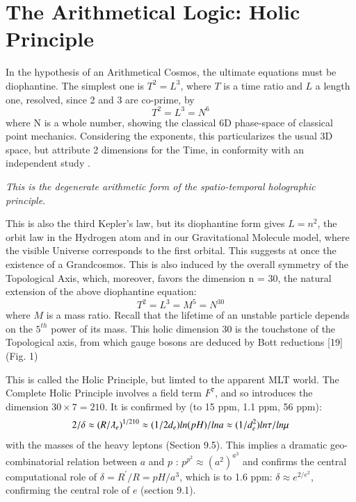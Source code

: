 \documentclass[twoside,draft]{article}
\begin{document}
\begin{sloppypar}
\section{The Arithmetical Logic: Holic Principle}

In the hypothesis of an Arithmetical Cosmos, the ultimate equations must be diophantine. The
simplest one is $T^{2} = L^{3}$, where $T$ is a time ratio and $L$ a length one, resolved, since 2 and 3 are 
co-prime, by $$T^{2} = L^{3} = N^{6}$$ where N is a whole number, showing the classical 6D phase-space of classical point mechanics. Considering the exponents, this particularizes the usual 3D space, but attribute 2 dimensions for the Time, in conformity with an independent study \cite{Bars}.

\textit{This is the degenerate arithmetic form of the spatio-temporal holographic principle}.

This is also the third Kepler's law, but its diophantine form gives $L = n^{2}$, the orbit law in the Hydrogen atom and in our
Gravitational Molecule model, where the visible Universe corresponds to the first orbital. This suggests at once the existence of a Grandcosmos. This is also induced by the overall symmetry of the Topological Axis, which, moreover, favors the
dimension n = 30, the natural extension of the above diophantine equation:
\begin{equation}
T^{2} = L^{3} = M^{5} = N^{30}
\end{equation}
where $M$ is a mass ratio. Recall that the lifetime of an unstable particle depends on the $5^{th}$ power of its mass. This holic dimension 30 is the touchstone of the Topological axis, from which gauge bosons are deduced by Bott reductions [19] (Fig. 1)

This is called the Holic Principle, but limted to the apparent MLT world. The Complete Holic
Principle \cite{Sanchez4} involves a field term $F^{7}$, and so introduces the dimension $30 \times 7 = 210$. It is confirmed by (to 15 ppm, 1.1 ppm, 56 ppm):
$$2/\delta \approx (R/\lambdabar_{e})^{1/210} \approx (1/2d_{e}) ln(pH)/lna \approx (1/d_e^{2})ln\tau/ln\mu$$
with the masses of the heavy leptons (Section 9.5). This implies a dramatic geo-combinatorial relation between $a$ and $p$ : $p^{p^{2}} \approx (a^{2})^{a^{3}}$ and confirms the central computational role of $\delta = R^{\prime}/R = pH/a^{3}$, which is to 1.6 ppm: $\delta \approx e^{2/e^2}$, confirming the central role of $e$ (section 9.1).


\end{sloppypar}
\end{document}
